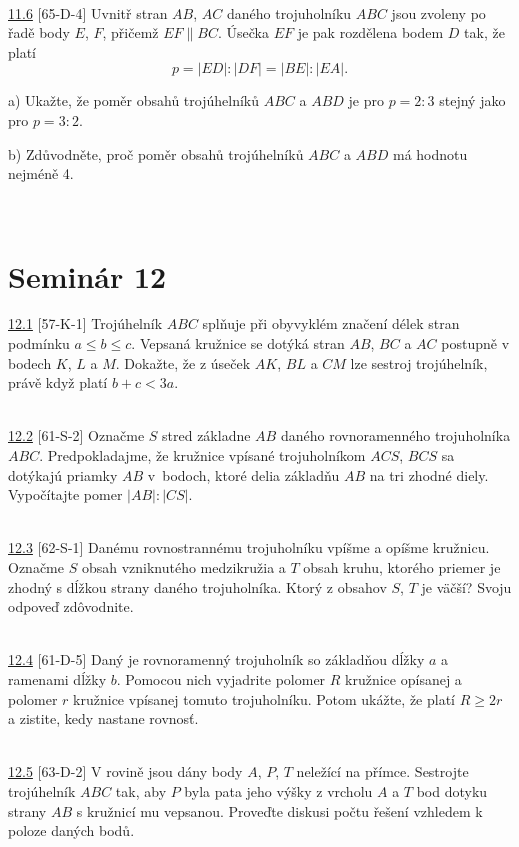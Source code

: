 \\

\noindent \ul{11.6} [65-D-4] Uvnitř stran $AB$, $AC$ daného trojuholníku $ABC$
jsou zvoleny po řadě body $E$, $F$, přičemž $EF \parallel BC$. Úsečka $EF$ je
pak rozdělena bodem $D$ tak, že platí $$p = |ED| : |DF | = |BE| : |EA|.$$

a) Ukažte, že poměr obsahů trojúhelníků $ABC$ a $ABD$ je pro $p = 2 : 3$ stejný jako pro $p = 3 : 2$.

b) Zdůvodněte, proč poměr obsahů trojúhelníků $ABC$ a $ABD$ má hodnotu nejméně 4.


\\

\section*{Seminár 12}

\noindent \ul{12.1} [57-K-1] Trojúhelník $ABC$ splňuje při obyvyklém značení délek stran podmínku $a
\leq b \leq c$. Vepsaná kružnice se dotýká stran $AB$, $BC$ a $AC$ postupně v bodech $K$, $L$ a $M$.
Dokažte, že z úseček $AK$, $BL$ a $CM$ lze sestroj trojúhelník, právě když platí $b + c <
3a$.


\\

\noindent \ul{12.2} [61-S-2] Označme $S$ stred základne $AB$ daného rovnoramenného trojuholníka $ABC$. Predpokladajme, že kružnice vpísané trojuholníkom $ACS$, $BCS$ sa dotýkajú priamky $AB$ v~bodoch, ktoré delia základňu $AB$ na tri zhodné diely. Vypočítajte pomer $|AB| : |CS|$.


\\

\noindent \ul{12.3} [62-S-1] Danému rovnostrannému trojuholníku vpíšme a opíšme kružnicu. Označme $S$ obsah vzniknutého medzikružia a $T$ obsah kruhu, ktorého priemer je zhodný s dĺžkou strany daného trojuholníka. Ktorý z obsahov $S$, $T$ je väčší? Svoju odpoveď zdôvodnite.


\\

\noindent \ul{12.4} [61-D-5] Daný je rovnoramenný trojuholník so základňou dĺžky $a$ a ramenami dĺžky $b$. Pomocou nich vyjadrite polomer $R$ kružnice opísanej a polomer $r$ kružnice vpísanej tomuto trojuholníku. Potom ukážte, že platí $R \geq 2r$ a zistite, kedy nastane rovnosť.


\\

\noindent \ul{12.5} [63-D-2]  V rovině jsou dány body $A$, $P$, $T$ neležící na
přímce. Sestrojte trojúhelník $ABC$ tak, aby $P$ byla pata jeho výšky z vrcholu
$A$ a $T$ bod dotyku strany $AB$ s kružnicí mu vepsanou. Proveďte diskusi počtu
řešení vzhledem k poloze daných bodů.

